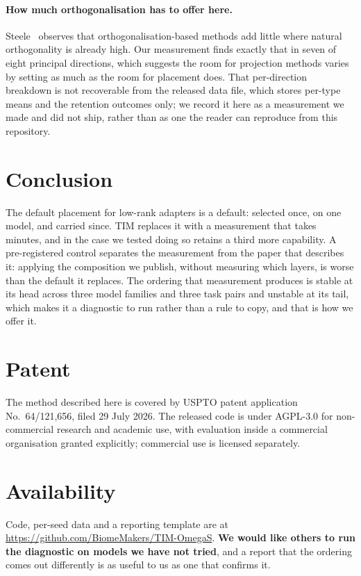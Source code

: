 \documentclass[11pt]{article}
\begin{document}
\paragraph{How much orthogonalisation has to offer here.}
Steele~\cite{steele2026} observes that orthogonalisation-based methods add
little where natural orthogonality is already high. Our measurement finds
exactly that in seven of eight principal directions, which suggests the room for
projection methods varies by setting as much as the room for placement does.
That per-direction breakdown is not recoverable from the released
data file, which stores per-type means and the retention outcomes only; we
record it here as a measurement we made and did not ship, rather than as one
the reader can reproduce from this repository.

\section{Conclusion}

The default placement for low-rank adapters is a default: selected once, on one
model, and carried since. TIM replaces it with a measurement that takes minutes, and in the case we
tested doing so retains a third more capability. A pre-registered control separates the
measurement from the paper that describes it: applying the composition we publish, without
measuring which layers, is worse than the default it replaces. The
ordering that measurement produces is stable at its head across three model
families and three task pairs and unstable at its tail, which makes it a
diagnostic to run rather than a rule to copy, and that is how we offer it.

\section*{Patent}

The method described here is covered by USPTO patent application
No.~64/121,656, filed 29 July 2026. The released code is under AGPL-3.0 for
non-commercial research and academic use, with evaluation inside a commercial
organisation granted explicitly; commercial use is licensed separately.

\section*{Availability}

Code, per-seed data and a reporting template are at\\
\url{https://github.com/BiomeMakers/TIM-OmegaS}. \textbf{We would like
others to run the diagnostic on models we have not tried}, and a report that the
ordering comes out differently is as useful to us as one that confirms it.
\end{document}
